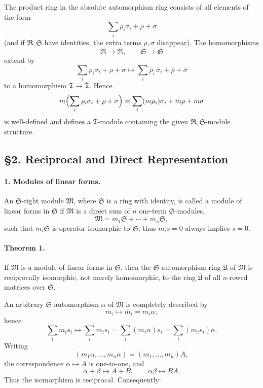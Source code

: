 \documentclass[11pt]{article}
\providecommand{\frR}{\mathfrak R}
\providecommand{\frS}{\mathfrak S}
\providecommand{\frT}{\mathfrak T}
\providecommand{\frM}{\mathfrak M}
\providecommand{\frU}{\mathfrak U}
\begin{document}
The product ring in the absolute automorphism ring consists of all elements of the form
\[
        \sum_i \rho_i\sigma_i+\rho+\sigma
\]
(and if \(\frR,\frS\) have identities, the extra terms \(\rho,\sigma\) disappear). The homomorphisms
\[
        \frR\to\overline{\frR},\qquad \frS\to\overline{\frS}
\]
extend by
\[
        \sum_i \rho_i\sigma_i+\rho+\sigma
        \longmapsto
        \sum_i \overline\rho_i\,\overline\sigma_i+\overline\rho+\overline\sigma
\]
to a homomorphism \(\frT\to\overline{\frT}\). Hence
\[
        m\Bigl(\sum_i \rho_i\sigma_i+\rho+\sigma\Bigr)
        =\sum_i (m\rho_i)\sigma_i+m\rho+m\sigma
\]
is well-defined and defines a \(\frT\)-module containing the given \(\frR,\frS\)-module structure.

\subsection*{§2. Reciprocal and Direct Representation}

\paragraph{1. Modules of linear forms.}
An \(\frS\)-right module \(\frM\), where \(\frS\) is a ring with identity, is called a module of linear forms in \(\frS\) if \(\frM\) is a direct sum of \(n\) one-term \(\frS\)-modules,
\[
        \frM=m_1\frS+\cdots+m_n\frS,
\]
such that \(m_i\frS\) is operator-isomorphic to \(\frS\); thus \(m_i s=0\) always implies \(s=0\).

\paragraph{Theorem 1.}
If \(\frM\) is a module of linear forms in \(\frS\), then the \(\frS\)-automorphism ring \(\frU\) of \(\frM\) is reciprocally isomorphic, not merely homomorphic, to the ring \(\overline{\frU}\) of all \(n\)-rowed matrices over \(\frS\).

An arbitrary \(\frS\)-automorphism \(\alpha\) of \(\frM\) is completely described by
\[
        m_i\longmapsto \overline m_i=m_i\alpha;
\]
hence
\[
        \sum_i m_i s_i\longmapsto
        \sum_i \overline m_i s_i
        =\sum_i (m_i\alpha)s_i
        =\sum_i (m_i s_i)\alpha.
\]
Writing
\[
        (m_1\alpha,\ldots,m_n\alpha)=(m_1,\ldots,m_n)A,
\]
the correspondence \(\alpha\mapsto A\) is one-to-one, and
\[
        \alpha+\beta\mapsto A+B,\qquad
        \alpha\beta\mapsto BA.
\]
Thus the isomorphism is reciprocal. Consequently:
\end{document}

